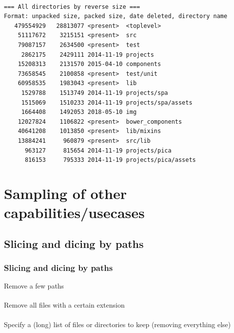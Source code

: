 \documentclass[compress,t,aspectratio=169]{beamer}
\begin{document}

\begin{frame}[containsverbatim]

   \\
  {\small
  \begin{verbatim}
=== All directories by reverse size ===
Format: unpacked size, packed size, date deleted, directory name
   479554929   28813077 <present>  <toplevel>
    51117672    3215151 <present>  src
    79087157    2634500 <present>  test
     2862175    2429111 2014-11-19 projects
    15208313    2131570 2015-04-10 components
    73658545    2100858 <present>  test/unit
    60958535    1983043 <present>  lib
     1529788    1513749 2014-11-19 projects/spa
     1515069    1510233 2014-11-19 projects/spa/assets
     1664408    1492053 2018-05-10 img
    12027824    1106822 <present>  bower_components
    40641208    1013850 <present>  lib/mixins
    13884241     960879 <present>  src/lib
      963127     815654 2014-11-19 projects/pica
      816153     795333 2014-11-19 projects/pica/assets
  \end{verbatim}
  }

\end{frame}

\section[Usecases]{Sampling of other capabilities/usecases}
\subsection[Paths]{Slicing and dicing by paths}

\begin{frame}
  \frametitle{Slicing and dicing by paths}

  Remove a few paths\\
  \\

  \pause
  \vspace*{0.75\baselineskip}
  Remove all files with a certain extension\\
  \\

  \pause
  \vspace*{0.75\baselineskip}
  Specify a (long) list of files or directories to keep (removing everything else)\\
  \\

\end{frame}
\end{document}
